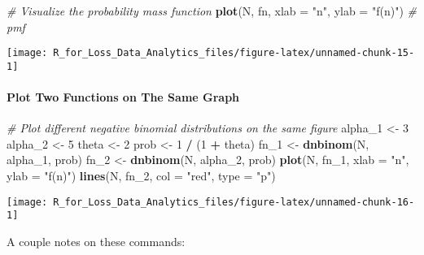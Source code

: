 \documentclass[]{book}
\newenvironment{Shaded}{\begin{snugshade}}{\end{snugshade}}
\newcommand{\KeywordTok}[1]{\textcolor[rgb]{0.13,0.29,0.53}{\textbf{#1}}}
\newcommand{\DataTypeTok}[1]{\textcolor[rgb]{0.13,0.29,0.53}{#1}}
\newcommand{\DecValTok}[1]{\textcolor[rgb]{0.00,0.00,0.81}{#1}}
\newcommand{\StringTok}[1]{\textcolor[rgb]{0.31,0.60,0.02}{#1}}
\newcommand{\CommentTok}[1]{\textcolor[rgb]{0.56,0.35,0.01}{\textit{#1}}}
\newcommand{\OperatorTok}[1]{\textcolor[rgb]{0.81,0.36,0.00}{\textbf{#1}}}
\newcommand{\NormalTok}[1]{#1}
\let\oldparagraph\paragraph
\renewcommand{\paragraph}[1]{\oldparagraph{#1}\mbox{}}
\theoremstyle{definition}
\theoremstyle{definition}
\theoremstyle{definition}
\theoremstyle{remark}
\begin{document}
\begin{Shaded}
\begin{Highlighting}[]
\CommentTok{# Visualize the probability mass function}
\KeywordTok{plot}\NormalTok{(N, fn, }\DataTypeTok{xlab =} \StringTok{"n"}\NormalTok{, }\DataTypeTok{ylab =} \StringTok{"f(n)"}\NormalTok{) }\CommentTok{# pmf}
\end{Highlighting}
\end{Shaded}

\begin{center}\texttt{[image: R\_for\_Loss\_Data\_Analytics\_files/figure-latex/unnamed-chunk-15-1]} \end{center}

\paragraph{Plot Two Functions on The Same
Graph}\label{plot-two-functions-on-the-same-graph}

\begin{Shaded}
\begin{Highlighting}[]
\CommentTok{# Plot different negative binomial distributions on the same figure}
\NormalTok{alpha_}\DecValTok{1}\NormalTok{ <-}\StringTok{ }\DecValTok{3}
\NormalTok{alpha_}\DecValTok{2}\NormalTok{ <-}\StringTok{ }\DecValTok{5}
\NormalTok{theta <-}\StringTok{ }\DecValTok{2}
\NormalTok{prob <-}\StringTok{ }\DecValTok{1} \OperatorTok{/}\StringTok{ }\NormalTok{(}\DecValTok{1} \OperatorTok{+}\StringTok{ }\NormalTok{theta)}
\NormalTok{fn_}\DecValTok{1}\NormalTok{ <-}\StringTok{ }\KeywordTok{dnbinom}\NormalTok{(N, alpha_}\DecValTok{1}\NormalTok{, prob)}
\NormalTok{fn_}\DecValTok{2}\NormalTok{ <-}\StringTok{ }\KeywordTok{dnbinom}\NormalTok{(N, alpha_}\DecValTok{2}\NormalTok{, prob)}
\KeywordTok{plot}\NormalTok{(N, fn_}\DecValTok{1}\NormalTok{, }\DataTypeTok{xlab =} \StringTok{"n"}\NormalTok{, }\DataTypeTok{ylab =} \StringTok{"f(n)"}\NormalTok{)}
\KeywordTok{lines}\NormalTok{(N, fn_}\DecValTok{2}\NormalTok{, }\DataTypeTok{col =} \StringTok{"red"}\NormalTok{, }\DataTypeTok{type =} \StringTok{"p"}\NormalTok{)}
\end{Highlighting}
\end{Shaded}

\begin{center}\texttt{[image: R\_for\_Loss\_Data\_Analytics\_files/figure-latex/unnamed-chunk-16-1]} \end{center}

A couple notes on these commands:
\end{document}
